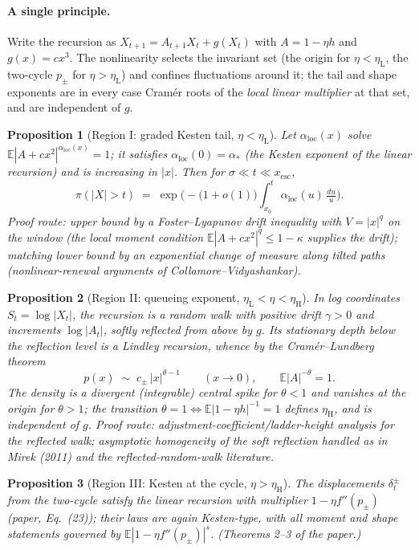 \documentclass{article} %
\theoremstyle{plain}
\newtheorem{proposition}{Proposition}
\theoremstyle{definition}
\begin{document}
\begin{itemize}[nosep,leftmargin=*]
\paragraph{A single principle.}
Write the recursion as $X_{t+1}=A_{t+1}X_t+g(X_t)$ with $A=1-\eta h$ and
$g(x)=cx^3$. The nonlinearity selects the invariant set (the origin for
$\eta<\eta_{\mathrm L}$, the two-cycle $p_\pm$ for $\eta>\eta_{\mathrm L}$)
and confines fluctuations around it; the tail and shape exponents are in
every case Cram\'er roots of the \emph{local linear multiplier} at that set,
and are independent of $g$.

\begin{proposition}[Region I: graded Kesten tail, $\eta<\eta_{\mathrm L}$]
Let $\alpha_{\mathrm{loc}}(x)$ solve
$\mathbb E|A+cx^2|^{\alpha_{\mathrm{loc}}(x)}=1$; it satisfies
$\alpha_{\mathrm{loc}}(0)=\alpha_*$ (the Kesten exponent of the linear
recursion) and is increasing in $|x|$. Then for
$\sigma\ll t\ll x_{\mathrm{esc}}$,
\[
\pi(|X|>t)\;=\;\exp\Big(-\big(1+o(1)\big)\!\int_{x_0}^{t}
\alpha_{\mathrm{loc}}(u)\,\tfrac{du}{u}\Big).
\]
\emph{Proof route: upper bound by a Foster--Lyapunov drift inequality with
$V=|x|^{q}$ on the window (the local moment condition
$\mathbb E|A+cx^2|^{q}\le1-\kappa$ supplies the drift); matching lower
bound by an exponential change of measure along tilted paths
(nonlinear-renewal arguments of Collamore--Vidyashankar).}
\end{proposition}

\begin{proposition}[Region II: queueing exponent,
$\eta_{\mathrm L}<\eta<\eta_{\mathrm H}$]
In log coordinates $S_t=\log|X_t|$, the recursion is a random walk with
positive drift $\gamma>0$ and increments $\log|A_t|$, softly reflected from
above by $g$. Its stationary depth below the reflection level is a Lindley
recursion, whence by the Cram\'er--Lundberg theorem
\[
p(x)\;\sim\;c_\pm\,|x|^{\theta-1}\qquad(x\to0),\qquad
\mathbb E|A|^{-\theta}=1 .
\]
The density is a divergent (integrable) central spike for $\theta<1$ and
vanishes at the origin for $\theta>1$; the transition
$\theta=1\iff\mathbb E|1-\eta h|^{-1}=1$ defines $\eta_{\mathrm H}$, and is
independent of $g$.
\emph{Proof route: adjustment-coefficient/ladder-height analysis for the
reflected walk; asymptotic homogeneity of the soft reflection handled as in
Mirek (2011) and the reflected-random-walk literature.}
\end{proposition}

\begin{proposition}[Region III: Kesten at the cycle, $\eta>\eta_{\mathrm H}$]
The displacements $\delta^\pm_t$ from the two-cycle satisfy the linear
recursion with multiplier $1-\eta f''(p_\pm)$ (paper, Eq.~(23)); their laws
are again Kesten-type, with all moment and shape statements governed by
$\mathbb E|1-\eta f''(p_\pm)|^{s}$. \emph{(Theorems 2--3 of the paper.)}
\end{proposition}



\end{itemize}
\end{document}
